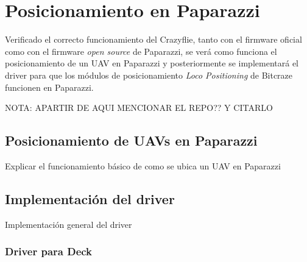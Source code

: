 \chapter{Posicionamiento en Paparazzi}

Verificado el correcto funcionamiento del Crazyflie, tanto con el firmware oficial como con el firmware \textit{open source} de Paparazzi,
se verá como funciona el posicionamiento de un UAV en Paparazzi y posteriormente se implementará el driver para que los módulos de posicionamiento 
\textit{Loco Positioning} de Bitcraze funcionen en Paparazzi.

NOTA: APARTIR DE AQUI MENCIONAR EL REPO?? Y CITARLO \cite{bt-crazyflies}


\section{Posicionamiento de UAVs en Paparazzi}

Explicar el funcionamiento básico de como se ubica un UAV en Paparazzi


\section{Implementación del driver}

Implementación general del driver


\subsection{Driver para Deck}

